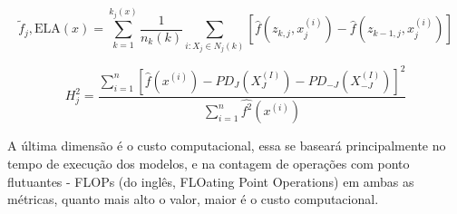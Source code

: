 \documentclass[12pt]{article}%
\begin{document}
	\begin{equation}
		\label{eq:ELA}
		\tilde{f}_j,\text{ELA}(x) = \sum_{k=1}^{k_j(x)}\frac{1}{n_k(k)} \sum_{i:X_j \in N_j(k)}[\hat{f}(z_{k,j},x_j^{(i)})-\hat{f}(z_{k-1,j},x_j^{(i)})]
	\end{equation}
	
	\begin{equation}
		\label{eq:H}
		H_j^2 = \frac{ \sum_{i=1}^{n}[\hat{f}(x^{(i)})-PD_J(X_J^{(I)})-PD_{-J}(X_{-J}^{(I)})]^2}{\sum_{i=1}^{n}\hat{f^2}(x^{(i)})}
	\end{equation}
	
	A última dimensão é o custo computacional, essa se baseará principalmente no tempo de execução dos modelos, e na contagem de operações com ponto flutuantes - FLOPs (do inglês, FLOating Point Operations) em ambas as métricas, quanto mais alto o valor, maior é o custo computacional.
	
	
\end{document}

